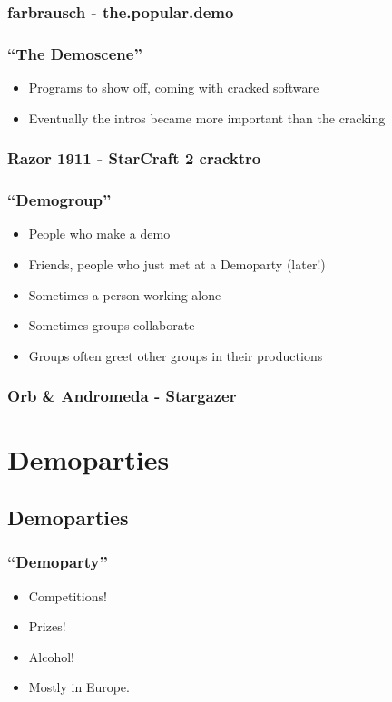 \documentclass[t,14pt,aspectratio=169]{beamer}
\begin{document}
\begin{frame}
\frametitle{farbrausch - the.popular.demo}
\end{frame}

\begin{frame}
\frametitle{``The Demoscene''}
\begin{itemize}
\item Programs to show off, coming with cracked software
\item Eventually the intros became more important than the cracking
\end{itemize}
\end{frame}

\begin{frame}
\frametitle{Razor 1911 - StarCraft 2 cracktro}
\end{frame}

\begin{frame}
\frametitle{``Demogroup''}
\begin{itemize}
\item People who make a demo
\item Friends, people who just met at a Demoparty (later!)
\item Sometimes a person working alone
\item Sometimes groups collaborate
\item Groups often greet other groups in their productions
\end{itemize}
\end{frame}

\begin{frame}
\frametitle{Orb \& Andromeda - Stargazer}
\end{frame}

\section{Demoparties}
\subsection{Demoparties}

\begin{frame}
\frametitle{``Demoparty''}
\begin{itemize}
\item Competitions!
\item Prizes!
\item Alcohol!
\item Mostly in Europe.
\end{itemize}
\end{frame}
\end{document}
